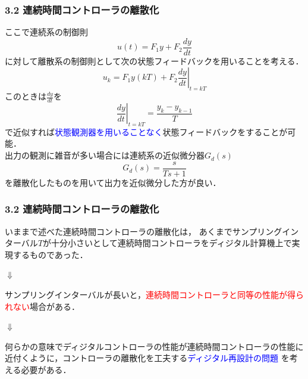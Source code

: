 \documentclass[10pt]{beamer}
\begin{document}
\begin{frame}[t]
\frametitle{3.2 連続時間コントローラの離散化}
ここで連続系の制御則
\begin{equation}
 u(t) = F_1 y + F_2 \frac{dy}{dt} \tag{3.12}
\end{equation}
に対して離散系の制御則として次の状態フィードバックを用いることを考える．
\begin{equation}
 u_k = F_1 y(kT) + F_2 \left.\frac{dy}{dt} \right\vert_{t = kT}
\end{equation}
このときは$\frac{dy}{dt}$を
\begin{equation}
 \left.\frac{dy}{dt}\right\vert_{t = kT} = \frac{y_k - y_{k-1}}{T}
\end{equation}
で近似すれば\textcolor{blue}{状態観測器を用いることなく}状態フィードバックをすることが可能．\\
出力の観測に雑音が多い場合には連続系の近似微分器$G_d(s)$
\begin{equation}
 G_d(s) = \frac{s}{Ts + 1}
\end{equation}
を離散化したものを用いて出力を近似微分した方が良い．
\end{frame}


\begin{frame}[t]
\frametitle{3.2 連続時間コントローラの離散化}
いままで述べた連続時間コントローラの離散化は，
あくまでサンプリングインターバル$T$が十分小さいとして連続時間コントローラをディジタル計算機上で実現するものであった．

\hspace*{2cm}
$\Downarrow$ 

サンプリングインターバルが長いと，\textcolor{red}{連続時間コントローラと同等の性能が得られない}場合がある．

\hspace*{2cm}
$\Downarrow$ 

何らかの意味でディジタルコントローラの性能が連続時間コントローラの性能に近付くように，コントローラの離散化を工夫する\textcolor{blue}{ディジタル再設計の問題} を考える必要がある．

\end{frame}
\end{document}
